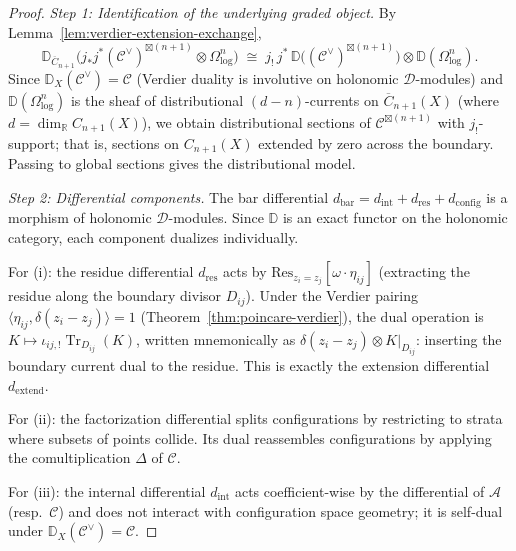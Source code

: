 \begin{proof}
\emph{Step 1: Identification of the underlying graded object.}
By Lemma~\ref{lem:verdier-extension-exchange},
\[
\mathbb{D}_{\overline{C}_{n+1}}\bigl(
 j_* j^* (\mathcal{C}^\vee)^{\boxtimes(n+1)}
 \otimes \Omega^n_{\log}
\bigr)
\;\cong\;
j_!\, j^*\, \mathbb{D}\bigl(
 (\mathcal{C}^\vee)^{\boxtimes(n+1)}
\bigr)
\otimes \mathbb{D}(\Omega^n_{\log}).
\]
Since $\mathbb{D}_X(\mathcal{C}^\vee) = \mathcal{C}$ (Verdier duality is
involutive on holonomic $\mathcal{D}$-modules) and
$\mathbb{D}(\Omega^n_{\log})$ is the sheaf of distributional $(d-n)$-currents
on $\overline{C}_{n+1}(X)$ (where $d = \dim_{\mathbb{R}} C_{n+1}(X)$), we obtain
distributional sections of $\mathcal{C}^{\boxtimes(n+1)}$ with
$j_!$-support; that is, sections on $C_{n+1}(X)$ extended by zero across the
boundary. Passing to global sections gives the distributional model.

\emph{Step 2: Differential components.}
The bar differential $d_{\mathrm{bar}} = d_{\mathrm{int}} + d_{\mathrm{res}}
+ d_{\mathrm{config}}$ is a morphism of holonomic $\mathcal{D}$-modules.
Since $\mathbb{D}$ is an exact functor on the holonomic category, each
component dualizes individually.

For (i): the residue differential $d_{\mathrm{res}}$ acts by
$\mathrm{Res}_{z_i = z_j}[\omega \cdot \eta_{ij}]$ (extracting the residue
along the boundary divisor $D_{ij}$). Under the Verdier pairing
$\langle \eta_{ij}, \delta(z_i - z_j)\rangle = 1$
(Theorem~\ref{thm:poincare-verdier}), the dual operation is
$K \mapsto \iota_{ij,!}\operatorname{Tr}_{D_{ij}}(K)$, written
mnemonically as $\delta(z_i-z_j)\otimes K|_{D_{ij}}$: inserting the
boundary current dual to the residue. This is exactly the extension
differential $d_{\mathrm{extend}}$.

For (ii): the factorization differential splits configurations by restricting
to strata where subsets of points collide. Its dual reassembles
configurations by applying the comultiplication $\Delta$ of $\mathcal{C}$.

For (iii): the internal differential $d_{\mathrm{int}}$ acts
coefficient-wise by the differential of $\mathcal{A}$ (resp.\ $\mathcal{C}$)
and does not interact with configuration space geometry; it is self-dual
under $\mathbb{D}_X(\mathcal{C}^\vee) = \mathcal{C}$.
\end{proof}

